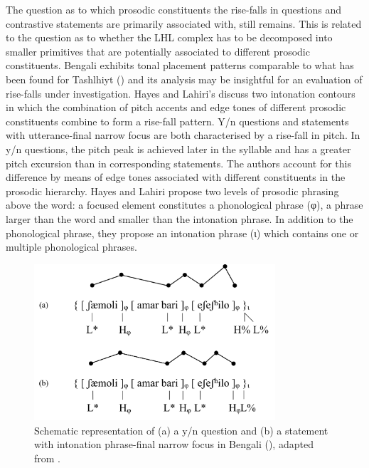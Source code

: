 The question as to which prosodic constituents the rise-falls in questions and contrastive statements are primarily associated with, still remains. This is related to the question as to whether the LHL complex has to be decomposed into smaller primitives that are potentially associated to different prosodic constituents. Bengali exhibits tonal placement patterns comparable to what has been found for Tashlhiyt (\citealt{HayesLahiri1991}) and its analysis may be insightful for an evaluation of rise-falls under investigation. Hayes and Lahiri’s discuss two intonation contours in which the combination of pitch accents and edge tones of different prosodic constituents combine to form a rise-fall pattern. Y/n questions and statements with utterance-final narrow focus are both characterised by a rise-fall in pitch. In y/n questions, the pitch peak is achieved later in the syllable and has a greater pitch excursion than in corresponding statements. The authors account for this difference by means of edge tones associated with different constituents in the prosodic hierarchy. Hayes and Lahiri propose two levels of prosodic phrasing above the word: a focused element constitutes a phonological phrase (φ), a phrase larger than the word and smaller than the intonation phrase. In addition to the phonological phrase, they propose an intonation phrase (ɩ) which contains one or multiple phonological phrases.   

  \begin{figure}[h!]
  \centering 
   \includegraphics[width=0.8\textwidth]{figures/Figure_7_1.png}
  \caption{Schematic representation of (a) a y/n question and (b) a statement with intonation phrase-final narrow focus in Bengali (\citealt{HayesLahiri1991}), adapted from \citet[136]{Gussenhoven2002}.}
   \label{fig:7.1}
   \end{figure}

